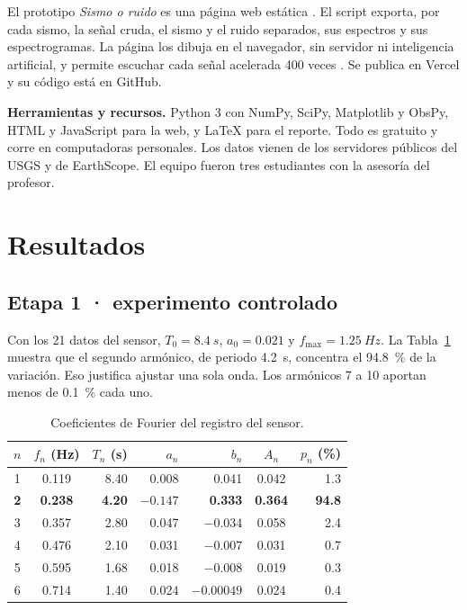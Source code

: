 \documentclass[11pt,letterpaper]{article}
\begin{document}
El prototipo \textit{Sismo o ruido} es una página web estática \parencite{prototipo}. El script exporta, por cada sismo, la señal cruda, el sismo y el ruido separados, sus espectros y sus espectrogramas. La página los dibuja en el navegador, sin servidor ni inteligencia artificial, y permite escuchar cada señal acelerada 400 veces \parencite{kilb2012}. Se publica en Vercel y su código está en GitHub.

\textbf{Herramientas y recursos.} Python 3 con NumPy, SciPy, Matplotlib y ObsPy, HTML y JavaScript para la web, y \LaTeX{} para el reporte. Todo es gratuito y corre en computadoras personales. Los datos vienen de los servidores públicos del USGS y de EarthScope. El equipo fueron tres estudiantes con la asesoría del profesor.

\section{Resultados}

\subsection{Etapa 1 · experimento controlado}
Con los 21 datos del sensor, $T_0 = \SI{8.4}{s}$, $a_0 = 0.021$ y $f_{\max} = \SI{1.25}{Hz}$. La Tabla~\ref{tab:fourier} muestra que el segundo armónico, de periodo \SI{4.2}{s}, concentra el \SI{94.8}{\percent} de la variación. Eso justifica ajustar una sola onda. Los armónicos 7 a 10 aportan menos de \SI{0.1}{\percent} cada uno.

\begin{table}[H]
\centering
\small
\begin{tabular}{ccrrrcr}
\toprule
$n$ & $f_n$ (Hz) & $T_n$ (s) & $a_n$ & $b_n$ & $A_n$ & $p_n$ (\%)\\
\midrule
1 & 0.119 & 8.40 & 0.008 & 0.041 & 0.042 & 1.3\\
\textbf{2} & \textbf{0.238} & \textbf{4.20} & $\mathbf{-0.147}$ & \textbf{0.333} & \textbf{0.364} & \textbf{94.8}\\
3 & 0.357 & 2.80 & 0.047 & $-0.034$ & 0.058 & 2.4\\
4 & 0.476 & 2.10 & 0.031 & $-0.007$ & 0.031 & 0.7\\
5 & 0.595 & 1.68 & 0.018 & $-0.008$ & 0.019 & 0.3\\
6 & 0.714 & 1.40 & 0.024 & $-0.00049$ & 0.024 & 0.4\\
\bottomrule
\end{tabular}
\caption{Coeficientes de Fourier del registro del sensor.}
\label{tab:fourier}
\end{table}
\end{document}
